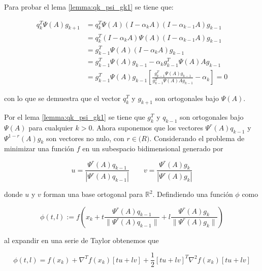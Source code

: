 Para probar el lema \ref{lemma:qk_psi_gk1} se tiene que:

\begin{align*}
	q_k^T \Psi(A)g_{k+1} & = q_k^T\Psi(A)(I-\alpha_kA)(I-\alpha_{k-1}A)g_{k-1}                                                        \\
	                     & = q_k^T(I-\alpha_kA)\Psi(A)(I-\alpha_{k-1}A)g_{k-1}                                                        \\
	                     & = g_{k-1}^T\Psi(A)(I-\alpha_kA)g_{k-1}                                                                     \\
	                     & =g_{k-1}^T\Psi(A)g_{k-1}-\alpha_kg_{k-1}^T\Psi(A)Ag_{k-1}                                                  \\
	                     & =g_{k-1}^T\Psi(A)g_{k-1}\left[\frac{g_{k-1}^T\Psi(A)g_{k-1}}{g_{k-1}^T\Psi(A)Ag_{k-1}}-\alpha_k\right] = 0
\end{align*}

con lo que se demuestra que el vector $q_k^T$ y $g_{k+1}$ son ortogonales bajo $\Psi(A)$.

Por el lema \ref{lemma:qk_psi_gk1} se tiene que $g_k^T$  y $q_{k-1}$ son ortogonales bajo $\Psi(A)$ para cualquier $k>0$. Ahora suponemos que los vectores $\Psi^r(A)q_{k-1}$ y $\Psi^{1-r}(A)g_k$ son vectores no nulo, con $r\in\mathbb(R)$. Considerando el problema de minimizar una función $f$ en un subespacio bidimensional generado por

\begin{equation}
	u = \frac{\Psi^r(A)q_{k-1}}{|\Psi^r(A)q_{k-1}|} \qquad
	v = \frac{\Psi^r(A)g_{k}}{|\Psi^r(A)g_{k}|} \label{eq:u_v}
\end{equation}

donde $u$ y $v$ forman una base ortogonal para $\mathbb{R}^2$. Defindiendo una función $\phi$ como

\begin{equation}
	\phi(t,l):=f\left(x_k+t\frac{\Psi^r(A)q_{k-1}}{\|\Psi^r(A)q_{k-1}\|} + l \frac{\Psi^r(A)g_{k}}{\|\Psi^r(A)g_{k}\|}\right) \label{eq:phi_definition}
\end{equation}

al expandir en una serie de Taylor obtenemos que

\begin{equation}
	\phi(t,l) = f(x_k)+\nabla^T f(x_k) \left[tu+lv \right] + \frac{1}{2}\left[tu+ lv \right]^T\nabla^2 f(x_k) \left[tu+lv \right] \label{eq:phi_taylor}
\end{equation}

